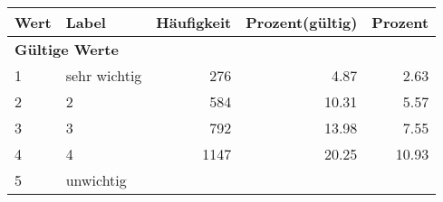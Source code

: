      \begin{longtable}{lXrrr}
     \toprule
     \textbf{Wert} & \textbf{Label} & \textbf{Häufigkeit} & \textbf{Prozent(gültig)} & \textbf{Prozent} \\
     \endhead
     \midrule
     \multicolumn{5}{l}{\textbf{Gültige Werte}}\\

     1 &
     \multicolumn{1}{X}{ sehr wichtig   } &


       \num{276} &
       \num[round-mode=places,round-precision=2]{4.87} &
         \num[round-mode=places,round-precision=2]{2.63} \\

     2 &
     \multicolumn{1}{X}{ 2   } &


       \num{584} &
       \num[round-mode=places,round-precision=2]{10.31} &
         \num[round-mode=places,round-precision=2]{5.57} \\

     3 &
     \multicolumn{1}{X}{ 3   } &


       \num{792} &
       \num[round-mode=places,round-precision=2]{13.98} &
         \num[round-mode=places,round-precision=2]{7.55} \\

     4 &
     \multicolumn{1}{X}{ 4   } &


       \num{1147} &
       \num[round-mode=places,round-precision=2]{20.25} &
         \num[round-mode=places,round-precision=2]{10.93} \\

     5 &
     \multicolumn{1}{X}{ unwichtig   } &



\end{longtable}
